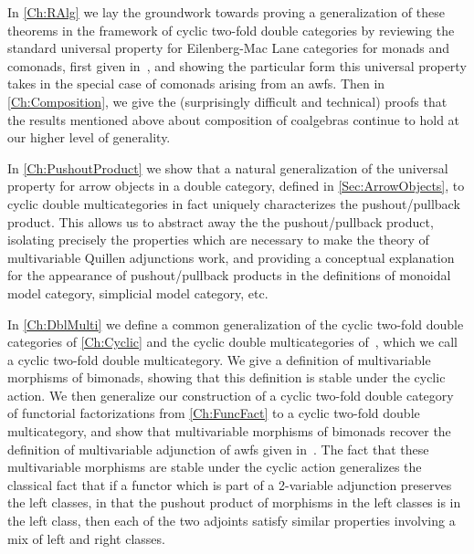 In \cref{Ch:RAlg} we lay the groundwork towards proving a generalization of these theorems in the framework of cyclic two-fold double categories by reviewing the standard universal property for Eilenberg-Mac Lane categories for monads and comonads, first given in~\cite{street:ftm}, and showing the particular form this universal property takes in the special case of comonads arising from an awfs. Then in \cref{Ch:Composition}, we give the (surprisingly difficult and technical) proofs that the results mentioned above about composition of coalgebras continue to hold at our higher level of generality.

In \cref{Ch:PushoutProduct} we show that a natural generalization of the universal property for arrow objects in a double category, defined in \cref{Sec:ArrowObjects}, to cyclic double multicategories in fact uniquely characterizes the pushout/pullback product. This allows us to abstract away the the pushout/pullback product, isolating precisely the properties which are necessary to make the theory of multivariable Quillen adjunctions work, and providing a conceptual explanation for the appearance of pushout/pullback products in the definitions of monoidal model category, simplicial model category, etc.

In \cref{Ch:DblMulti} we define a common generalization of the cyclic two-fold double categories of \cref{Ch:Cyclic} and the cyclic double multicategories of~\cite{cgr:mates}, which we call a cyclic two-fold double multicategory. We give a definition of multivariable morphisms of bimonads, showing that this definition is stable under the cyclic action. We then generalize our construction of a cyclic two-fold double category of functorial factorizations from \cref{Ch:FuncFact} to a cyclic two-fold double multicategory, and show that multivariable morphisms of bimonads recover the definition of multivariable adjunction of awfs given in~\cite{riehl:nwfs-monoidal}. The fact that these multivariable morphisms are stable under the cyclic action generalizes the classical fact that if a functor which is part of a 2-variable adjunction preserves the left classes, in that the pushout product of morphisms in the left classes is in the left class, then each of the two adjoints satisfy similar properties involving a mix of left and right classes.